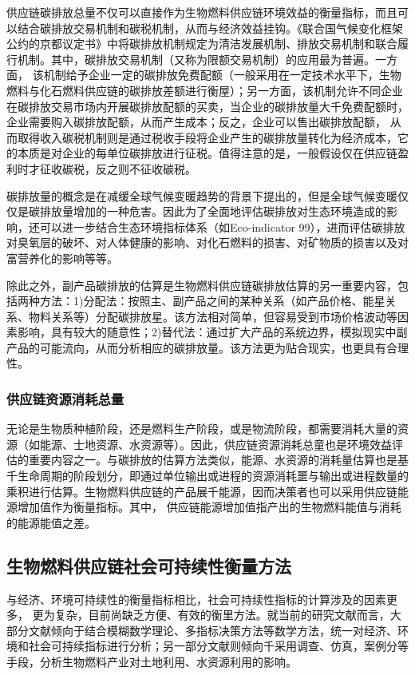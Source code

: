 供应链碳排放总量不仅可以直接作为生物燃料供应链环境效益的衡量指标，而且可以结合碳排放交易机制和碳税机制，从而与经济效益挂钩。《联合国气候变化框架公约的京都议定书》中将碳排放机制规定为清洁发展机制、排放交易机制和联合履行机制\cite{Hepburn2007}。其中，碳排放交易机制（又称为限额交易机制）的应用最为普遍。一方面， 该机制给予企业一定的碳排放免费配额（一般采用在一定技术水平下，生物燃料与化石燃料供应链的碳排放差额进行衡屋）；另一方面，该机制允许不同企业在碳排放交易市场内开展碳排放配额的买卖，当企业的碳排放量大千免费配额时，企业需要购入碳排放配额，从而产生成本；反之，企业可以售出碳排放配额， 从而取得收入\cite{Giarola2012}碳税机制则是通过税收手段将企业产生的碳排放量转化为经济成本，它的本质是对企业的每单位碳排放进行征税。值得注意的是，一般假设仅在供应链盈利时才征收碳税，反之则不征收碳税\cite{Zamboni2011}。

碳排放量的概念是在减缓全球气候变暖趋势的背景下提出的，但是全球气候变暖仅仅是碳排放量增加的一种危害。因此为了全面地评估碳排放对生态环境造成的影响，还可以进一步结合生态环境指标体系（如Eco-indicator 99）\cite{Sabio2012}，进而评估碳排放对臭氧层的破坏、对人体健康的影响、对化石燃料的损害、对矿物质的损害以及对富营养化的影响等等。

除此之外，副产品碳排放的估算是生物燃料供应链碳排放估算的另一重要内容，包括两种方法\cite{Malca2011}：1)分配法：按照主、副产品之间的某种关系（如产品价格、能星关系、物料关系等）分配碳排放星。该方法相对简单，但容易受到市场价格波动等因素影响，具有较大的随意性；2)替代法：通过扩大产品的系统边界，模拟现实中副产品的可能流向，从而分析相应的碳排放量。该方法更为贴合现实，也更具有合理性。

\subsubsection{供应链资源消耗总量}
无论是生物质种植阶段，还是燃料生产阶段，或是物流阶段，都需要消耗大量的资源（如能源、士地资源、水资源等）。因此，供应链资源消耗总童也是环境效益评估的重要内容之一。与碳排放的估算方法类似，能源\cite{Liu2014}、水资源\cite{Gerbens-Leenes2012}的消耗量估算也是基千生命周期的阶段划分，即通过单位输出或进程的资源消耗噩与输出或进程数量的乘积进行估算。生物燃料供应链的产品展千能源，因而决策者也可以采用供应链能源增加值作为衡量指标。其中， 供应链能源增加值指产出的生物燃料能值与消耗的能源能值之差。

\subsection{生物燃料供应链社会可持续性衡量方法}
与经济、环境可持续性的衡量指标相比，社会可持续性指标的计算涉及的因素更多，  更为复杂，目前尚缺乏方便、有效的衡里方法。就当前的研究文献而言，大部分文献倾向于结合模糊数学理论、多指标决策方法等数学方法，统一对经济、环境和社会可持续指标进行分析\cite{Markevicius2010, Zonin2014}；另一部分文献则倾向千采用调查\cite{Oladosu2013}、仿真\cite{Affuso2013}，案例分\cite{Kristoufek2012}等手段，分析生物燃料产业对土地利用、水资源利用的影响。

